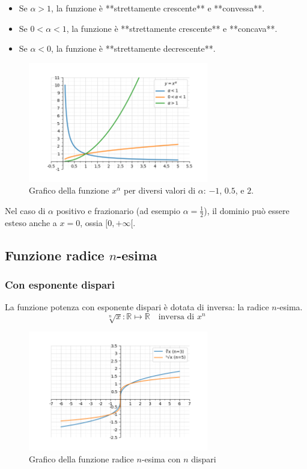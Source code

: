 \begin{itemize}
\item Se $\alpha > 1$, la funzione è **strettamente crescente** e **convessa**.
\item Se $0 < \alpha < 1$, la funzione è **strettamente crescente** e **concava**.
\item Se $\alpha < 0$, la funzione è **strettamente decrescente**.
\end{itemize}

\begin{figure}[H]
    \centering
    \includegraphics[width=0.7\textwidth]{./img/potenze_reali.png}
    \caption{Grafico della funzione $x^\alpha$ per diversi valori di $\alpha$: $-1$, $0.5$, e $2$.}
    \label{fig:potenze_reali}
\end{figure}
\FloatBarrier

Nel caso di $\alpha$ positivo e frazionario (ad esempio $\alpha = \frac{1}{2}$), il dominio può essere esteso anche a $x = 0$, ossia $[0, +\infty[$.


\subsection{Funzione radice $n$-esima}

\subsubsection{Con esponente dispari}
La funzione potenza con esponente dispari è dotata di inversa: la radice $n$-esima.
$$\sqrt[n]{x}: \mathbb{R} \mapsto \mathbb{R} \quad \text{inversa di } x^n$$

\begin{figure}[H]
    \centering
    \includegraphics[width=0.7\textwidth]{./img/radice_dispari.png}
    \caption{Grafico della funzione radice $n$-esima con $n$ dispari}
    \label{fig:radice_dispari}
\end{figure}
\FloatBarrier

